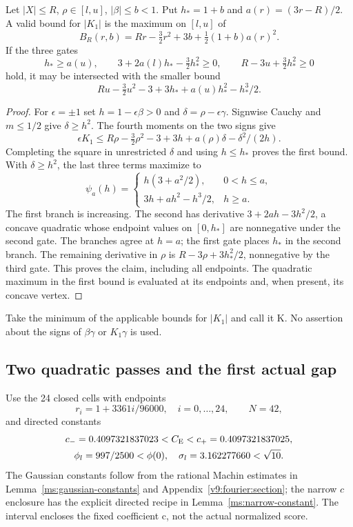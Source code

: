 \begin{lemma}\label{v9:entry:signed-K}
Let $|X|\le R$, $\rho\in[l,u]$, $|\beta|\le b<1$.
Put $h_*=1+b$ and $a(r)=(3r-R)/2$.
A valid bound for $|K_1|$ is the maximum on $[l,u]$ of
\[
 B_R(r,b)=Rr-\tfrac32r^2+3b+\tfrac12(1+b)a(r)^2.
\]
If the three gates
\[
 h_*\ge a(u),\qquad 3+2a(l)h_*-\tfrac32h_*^2\ge0,
 \qquad R-3u+\tfrac32h_*^2\ge0
\]
hold, it may be intersected with the smaller bound
\[
 Ru-\tfrac32u^2-3+3h_*+a(u)h_*^2-h_*^3/2.
\]
\end{lemma}
\begin{proof}
For $\epsilon=\pm1$ set $h=1-\epsilon\beta>0$ and
$\delta=\rho-\epsilon\gamma$. Signwise Cauchy and $m\le1/2$ give
$\delta\ge h^2$. The fourth moments on the two signs give
\[
 \epsilon K_1\le R\rho-\tfrac32\rho^2-3
                    +3h+a(\rho)\delta-\delta^2/(2h).
\]
Completing the square in unrestricted $\delta$ and using $h\le h_*$
proves the first bound. With $\delta\ge h^2$, the last three terms
maximize to
\[
 \psi_a(h)=
 \begin{cases}h(3+a^2/2),&0<h\le a,\\
                3h+ah^2-h^3/2,&h\ge a.
 \end{cases}
\]
The first branch is increasing. The second has derivative
$3+2ah-3h^2/2$, a concave quadratic whose endpoint values on
$[0,h_*]$ are nonnegative under the second gate. The branches agree
at $h=a$; the first gate places $h_*$ in the second branch. The
remaining derivative in $\rho$ is $R-3\rho+3h_*^2/2$, nonnegative
by the third gate. This proves the claim, including all endpoints.
The quadratic maximum in the first bound is evaluated at its endpoints
and, when present, its concave vertex.
\end{proof}
Take the minimum of the applicable bounds for $|K_1|$ and call it K.
No assertion about the signs of $\beta\gamma$ or $K_1\gamma$ is used.

\subsection{Two quadratic passes and the first actual gap}
\label{v9:entry:raw-cover}
Use the 24 closed cells with endpoints
\[
 r_i=1+3361i/96000,\quad i=0,\ldots,24,
 \qquad N=42,
\]
and directed constants
\begin{gather*}
 c_-=0.4097321837023<C_{\mathrm E}<c_+=0.4097321837025,\\
 \phi_l=997/2500<\phi(0),\quad\sigma_l=3.162277660<\sqrt{10}.
\end{gather*}
The Gaussian constants follow from the rational Machin estimates in
Lemma~\ref{ms:gaussian-constants} and Appendix~\ref{v9:fourier:section};
the narrow $c$ enclosure has the explicit directed recipe in
Lemma~\ref{ms:narrow-constant}. The interval encloses the fixed coefficient c,
not the actual normalized score.

